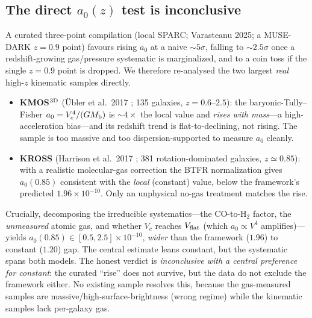 \documentclass[11pt]{article}
\newcommand{\az}{a_0}
\begin{document}
\subsection{The direct $\az(z)$ test is inconclusive}
A curated three-point compilation (local SPARC; Varasteanu 2025; a MUSE-DARK $z\!=\!0.9$ point) favours
rising $\az$ at a naive $\sim5\sigma$, falling to $\sim2.5\sigma$ once a redshift-growing gas/pressure
systematic is marginalized, and to a coin toss if the single $z\!=\!0.9$ point is dropped. We therefore
re-analysed the two largest \emph{real} high-$z$ kinematic samples directly.
\begin{itemize}\itemsep2pt
\item \textbf{KMOS$^{\rm 3D}$} (\"Ubler et al.\ 2017 \cite{ubler2017}; 135 galaxies, $z=0.6$--$2.5$):
the baryonic-Tully--Fisher $\az=V_c^4/(G M_{\rm b})$ is ${\sim}4\times$ the local value and \emph{rises
with mass}---a high-acceleration bias---and its redshift trend is flat-to-declining, not rising. The
sample is too massive and too dispersion-supported to measure $\az$ cleanly.
\item \textbf{KROSS} (Harrison et al.\ 2017 \cite{harrison2017}; 381 rotation-dominated galaxies,
$z\simeq0.85$): with a realistic molecular-gas correction \cite{tacconi2018} the BTFR normalization
gives $\az(0.85)$ consistent with the \emph{local} (constant) value, below the framework's predicted
$1.96\times10^{-10}$. Only an unphysical no-gas treatment matches the rise.
\end{itemize}
Crucially, decomposing the irreducible systematics---the CO-to-H$_2$ factor, the \emph{unmeasured}
atomic gas, and whether $V_c$ reaches $V_{\rm flat}$ (which $\az\propto V^4$ amplifies)---yields
$\az(0.85)\in[0.5,2.5]\times10^{-10}$, \emph{wider} than the framework ($1.96$) to constant ($1.20$)
gap. The central estimate leans constant, but the systematic spans both models. The honest verdict is
\emph{inconclusive with a central preference for constant}: the curated ``rise'' does not survive, but
the data do not exclude the framework either. No existing sample resolves this, because the
gas-measured samples are massive/high-surface-brightness (wrong regime) while the kinematic samples lack
per-galaxy gas.
\end{document}
